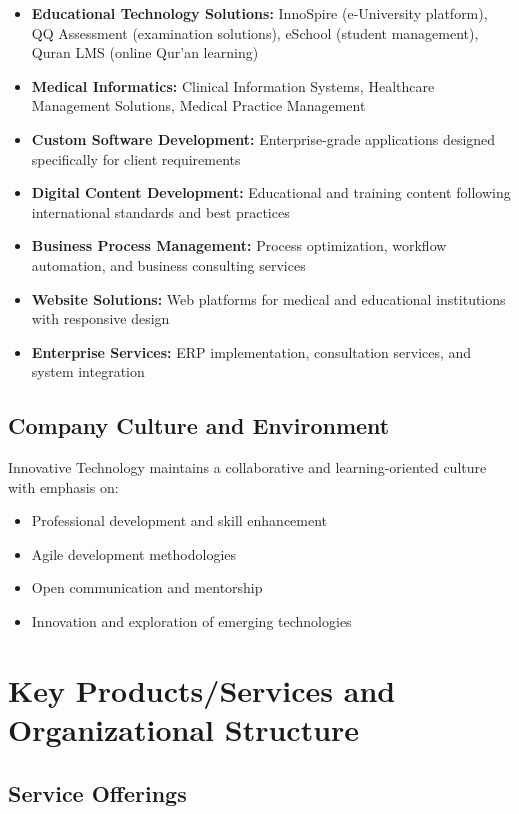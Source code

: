 \begin{itemize}
    \item \textbf{Educational Technology Solutions:} InnoSpire (e-University platform), QQ Assessment (examination solutions), eSchool (student management), Quran LMS (online Qur'an learning)
    \item \textbf{Medical Informatics:} Clinical Information Systems, Healthcare Management Solutions, Medical Practice Management
    \item \textbf{Custom Software Development:} Enterprise-grade applications designed specifically for client requirements
    \item \textbf{Digital Content Development:} Educational and training content following international standards and best practices
    \item \textbf{Business Process Management:} Process optimization, workflow automation, and business consulting services
    \item \textbf{Website Solutions:} Web platforms for medical and educational institutions with responsive design
    \item \textbf{Enterprise Services:} ERP implementation, consultation services, and system integration
\end{itemize}

\subsection{Company Culture and Environment}

Innovative Technology maintains a collaborative and learning-oriented culture with emphasis on:
\begin{itemize}
    \item Professional development and skill enhancement
    \item Agile development methodologies
    \item Open communication and mentorship
    \item Innovation and exploration of emerging technologies
\end{itemize}

\section{Key Products/Services and Organizational Structure}

\subsection{Service Offerings}

